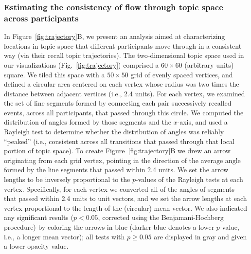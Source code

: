 \documentclass[10pt]{article}
\begin{document}
\subsubsection*{Estimating the consistency of flow through topic space across participants}
In Figure~\ref{fig:trajectory}B, we present an analysis aimed at characterizing locations in topic space that different participants move through in a consistent way (via their recall topic trajectories).  The two-dimensional topic space used in our visualizations (Fig.~\ref{fig:trajectory}) comprised a $60 \times 60$ (arbitrary units) square.  We tiled this space with a $50 \times 50$ grid of evenly spaced vertices, and defined a circular area centered on each vertex whose radius was two times the distance between adjacent vertices (i.e., 2.4 units).  For each vertex, we examined the set of line segments formed by connecting each pair successively recalled events, across all participants, that passed through this circle.  We computed the distribution of angles formed by those segments and the $x$-axis, and used a Rayleigh test to determine whether the distribution of angles was reliably ``peaked'' (i.e., consistent across all transitions that passed through that local portion of topic space).  To create Figure~\ref{fig:trajectory}B we drew an arrow originating from each grid vertex, pointing in the direction of the average angle formed by the line segments that passed within 2.4 units.  We set the arrow lengths to be inversely proportional to the $p$-values of the Rayleigh tests at each vertex.  Specifically, for each vertex we converted all of the angles of segments that passed within 2.4 units to unit vectors, and we set the arrow lengths at each vertex proportional to the length of the (circular) mean vector.  We also indicated any significant results ($p < 0.05$, corrected using the Benjamani-Hochberg procedure) by coloring the arrows in blue (darker blue denotes a lower $p$-value, i.e., a longer mean vector); all tests with $p \geq 0.05$ are displayed in gray and given a lower opacity value.
\end{document}
